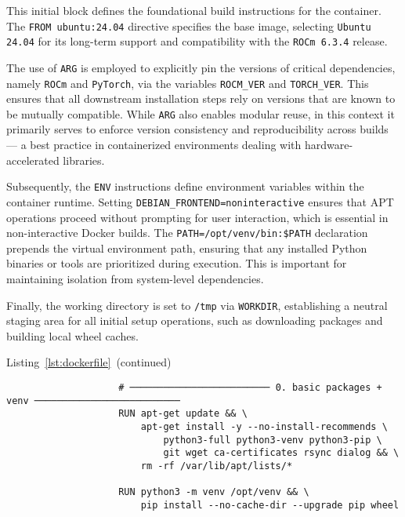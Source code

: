 This initial block defines the foundational build instructions for the container. The \texttt{FROM ubuntu:24.04} directive specifies the base image, selecting \texttt{Ubuntu 24.04} for its long-term support and compatibility with the \texttt{ROCm 6.3.4} release.

The use of \texttt{ARG} is employed to explicitly pin the versions of critical dependencies, namely \texttt{ROCm} and \texttt{PyTorch}, via the variables \texttt{ROCM\_VER} and \texttt{TORCH\_VER}. This ensures that all downstream installation steps rely on versions that are known to be mutually compatible. While \texttt{ARG} also enables modular reuse, in this context it primarily serves to enforce version consistency and reproducibility across builds --- a best practice in containerized environments dealing with hardware-accelerated libraries.

Subsequently, the \texttt{ENV} instructions define environment variables within the container runtime. Setting \texttt{DEBIAN\_FRONTEND=noninteractive} ensures that APT operations proceed without prompting for user interaction, which is essential in non-interactive Docker builds. The \texttt{PATH=/opt/venv/bin:\$PATH} declaration prepends the virtual environment path, ensuring that any installed Python binaries or tools are prioritized during execution. This is important for maintaining isolation from system-level dependencies.

Finally, the working directory is set to \texttt{/tmp} via \texttt{WORKDIR}, establishing a neutral staging area for all initial setup operations, such as downloading packages and building local wheel caches.

\vspace{1em}

\begin{minipage}{\textwidth}
	\captionsetup{type=listing}
	\caption*{Listing~\ref{lst:dockerfile}~(continued)}

	\begin{verbatim}
                    # ───────────────────────── 0. basic packages + venv ──────────────────────────
                    RUN apt-get update && \
                        apt-get install -y --no-install-recommends \
                            python3-full python3-venv python3-pip \
                            git wget ca-certificates rsync dialog && \
                        rm -rf /var/lib/apt/lists/*

                    RUN python3 -m venv /opt/venv && \
                        pip install --no-cache-dir --upgrade pip wheel

    \end{verbatim}
\end{minipage}

